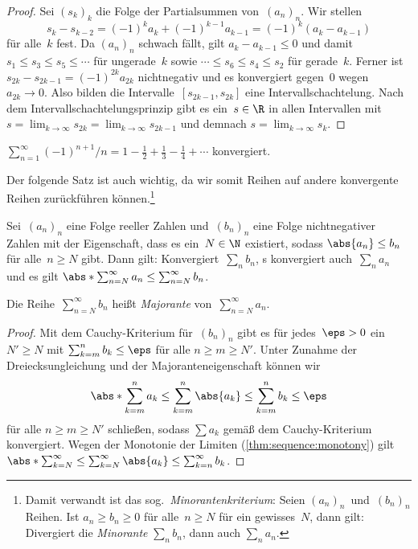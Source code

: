 \documentclass[a4paper]{article}
\begin{document}
\begin{proof}
    Sei $(s_k)_k$ die Folge der Partialsummen von~$(a_n)_n$. Wir stellen
    \begin{equation*}
        s_k - s_{k-2} = (-1)^k a_k + (-1)^{k-1} a_{k-1} = (-1)^k (a_k-a_{k-1})
    \end{equation*}
    für alle~$k$ fest. Da $(a_n)_n$ schwach fällt, gilt $a_k - a_{k-1} \leq 0$ und damit $s_1 \leq s_3 \leq s_5 \leq \cdots$ für ungerade~$k$ sowie $\cdots \leq s_6 \leq s_4 \leq s_2$ für gerade~$k$. Ferner ist $s_{2k} - s_{2k-1} = (-1)^{2k} a_{2k}$ nichtnegativ und es konvergiert gegen~0 wegen~$a_{2k} \to 0$. Also bilden die Intervalle~$[s_{2k-1}, s_{2k}]$ eine Intervallschachtelung. Nach dem Intervallschachtelungsprinzip gibt es ein~$s \in \R$ in allen Intervallen mit $s = \lim_{k\to\infty} s_{2k} = \lim_{k\to\infty} s_{2k-1}$ und demnach $s = \lim_{k\to\infty} s_k$.
\end{proof}

\begin{example}
    $\sum_{n=1}^\infty (-1)^{n+1}/n = 1 - \frac{1}{2} + \frac{1}{3} - \frac{1}{4} + \cdots$ konvergiert.
\end{example}

Der folgende Satz ist auch wichtig, da wir somit Reihen auf andere konvergente Reihen zurückführen können.\footnote{Damit verwandt ist das sog.\ \emph{Minorantenkriterium}: Seien $(a_n)_n$~und~$(b_n)_n$ Reihen. Ist $a_n \geq b_n \geq 0$ für alle~$n \geq N$ für ein gewisses~$N$, dann gilt: Divergiert die \emph{Minorante} $\sum_n b_n$, dann auch $\sum_n a_n$.}

\begin{theorem}[Majorantenkriterium]
    Sei~$(a_n)_n$ eine Folge reeller Zahlen und~$(b_n)_n$ eine Folge nichtnegativer Zahlen mit der Eigenschaft, dass es ein~$N \in \N$ existiert, sodass $\abs{a_n} \leq b_n$ für alle~$n \geq N$ gibt. Dann gilt: Konvergiert~$\sum_n b_n$, s konvergiert auch~$\sum_n a_n$ und es gilt $\abs*{\sum_{n=N}^\infty a_n} \leq \sum_{n=N}^\infty b_n$.

    Die Reihe~$\sum_{n=N}^\infty b_n$ heißt \emph{Majorante} von~$\sum_{n=N}^\infty a_n$.
\end{theorem}

\begin{proof}
    Mit dem Cauchy-Kriterium für~$(b_n)_n$ gibt es für jedes~$\eps > 0$ ein~$N' \geq N$ mit $\sum_{k=m}^n b_k \leq \eps$ für alle $n \geq m \geq N'$. Unter Zunahme der Dreiecksungleichung und der Majoranteneigenschaft können wir
    \begin{equation*}
        \abs*{\sum_{k=m}^n a_k} \leq \sum_{k=m}^n \abs{a_k} \leq \sum_{k=m}^n b_k \leq \eps
    \end{equation*}
    für alle $n \geq m \geq N'$ schließen, sodass $\sum a_k$ gemäß dem Cauchy-Kriterium konvergiert. Wegen der Monotonie der Limiten (\cref{thm:sequence:monotony}) gilt $\abs*{\sum_{k=N}^\infty} \leq \sum_{k=N}^\infty \abs{a_k} \leq \sum_{k=n}^\infty b_k$.
\end{proof}
\end{document}
